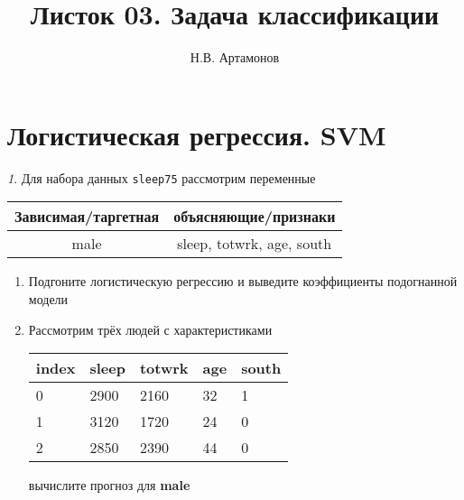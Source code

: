 \documentclass[12pt]{article}
\title{Листок 03. Задача классификации}
\author{Н.В. Артамонов}
\theoremstyle{remark}
\newtheorem{exercise}{}[section]
\begin{document}
\maketitle

\tableofcontents

\section{Логистическая регрессия. SVM}

\begin{exercise}
Для набора данных \texttt{sleep75} рассмотрим переменные

\begin{center}
	\begin{tabular}{|c|c|} \hline
		Зависимая/таргетная & объясняющие/признаки \\ \hline
		male & sleep, totwrk, age, south \\ \hline
	\end{tabular}
\end{center}
\begin{enumerate}
	\item Подгоните логистическую регрессию и выведите коэффициенты подогнанной модели
	\item Рассмотрим трёх людей с характеристиками
	\begin{center}
		\begin{tabular}{|l||l|l|l|l|}\hline
			index & sleep & totwrk & age & south  \\ \hline\hline
			0 & 2900 & 2160 & 32 & 1  \\
			1 & 3120 & 1720 & 24 & 0  \\
			2 & 2850 & 2390 & 44 & 0  \\ \hline
		\end{tabular}
	\end{center}
	вычислите прогноз для \textbf{male} 
\end{enumerate}
\end{exercise}
\end{document}

